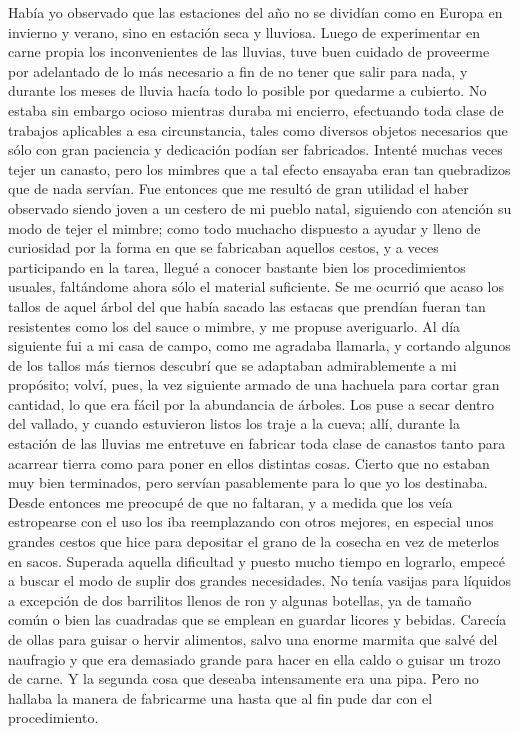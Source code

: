 \documentclass{novela}
\begin{document}
    Había yo observado que las estaciones del año no se dividían como en Europa en invierno y verano, sino en estación seca y lluviosa. Luego de experimentar en carne propia los inconvenientes de las lluvias, tuve buen cuidado de proveerme por adelantado de lo más necesario a fin de no tener que salir para nada, y durante los meses de lluvia hacía todo lo posible por quedarme a cubierto.
    No estaba sin embargo ocioso mientras duraba mi encierro, efectuando toda clase de trabajos aplicables a esa circunstancia, tales como diversos objetos necesarios que sólo con gran paciencia y dedicación podían ser fabricados. Intenté muchas veces tejer un canasto, pero los mimbres que a tal efecto ensayaba eran tan quebradizos que de nada servían. Fue entonces que me resultó de gran utilidad el haber observado siendo joven a un cestero de mi pueblo natal, siguiendo con atención su modo de tejer el mimbre; como todo muchacho dispuesto a ayudar y lleno de curiosidad por la forma en que se fabricaban aquellos cestos, y a veces participando en la tarea, llegué a conocer bastante bien los procedimientos usuales, faltándome ahora sólo el material suficiente. Se me ocurrió que acaso los tallos de aquel árbol del que había sacado las estacas que prendían fueran tan resistentes como los del sauce o mimbre, y me propuse averiguarlo.
    Al día siguiente fui a mi casa de campo, como me agradaba llamarla, y cortando algunos de los tallos más tiernos descubrí que se adaptaban admirablemente a mi propósito; volví, pues, la vez siguiente armado de una hachuela para cortar gran cantidad, lo que era fácil por la abundancia de árboles. Los puse a secar dentro del vallado, y cuando estuvieron listos los traje a la cueva; allí, durante la estación de las lluvias me entretuve en fabricar toda clase de canastos tanto para acarrear tierra como para poner en ellos distintas cosas. Cierto que no estaban muy bien terminados, pero servían pasablemente para lo que yo los destinaba. Desde entonces me preocupé de que no faltaran, y a medida que los veía estropearse con el uso los iba reemplazando con otros mejores, en especial unos grandes cestos que hice para depositar el grano de la cosecha en vez de meterlos en sacos.
    Superada aquella dificultad y puesto mucho tiempo en lograrlo, empecé a buscar el modo de suplir dos grandes necesidades. No tenía vasijas para líquidos a excepción de dos barrilitos llenos de ron y algunas botellas, ya de tamaño común o bien las cuadradas que se emplean en guardar licores y bebidas. Carecía de ollas para guisar o hervir alimentos, salvo una enorme marmita que salvé del naufragio y que era demasiado grande para hacer en ella caldo o guisar un trozo de carne. Y la segunda cosa que deseaba intensamente era una pipa. Pero no hallaba la manera de fabricarme una hasta que al fin pude dar con el procedimiento.
\end{document}
